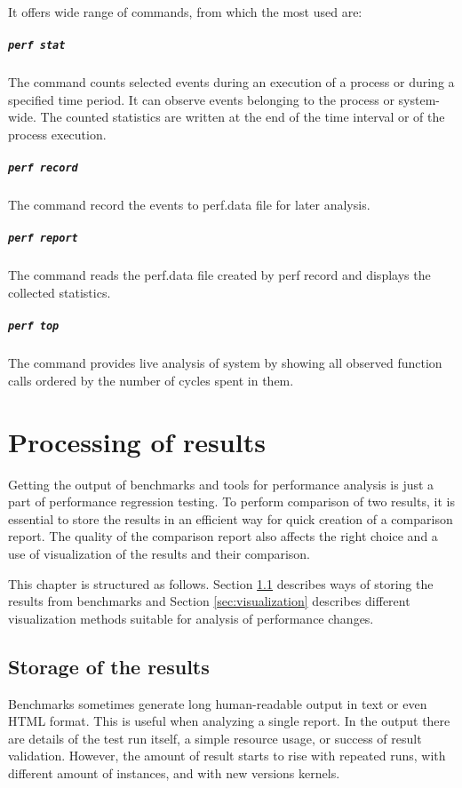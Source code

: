 It offers wide range of commands, from which the most used are:
\paragraph{\texttt{perf stat}} The command counts selected events during an
execution of a process or during a specified time period. It can observe events belonging
to the process or system-wide. The counted statistics are written at the end of the
time interval or of the process execution.
\paragraph{\texttt{perf record}} The command record the events to perf.data file for later
analysis.
\paragraph{\texttt{perf report}} The command reads the perf.data file created by perf record
and displays the collected statistics.
\paragraph{\texttt{perf top}} The command provides live analysis of system by showing all
observed function calls ordered by the number of cycles spent in them.



\chapter{Processing of results} \label{ch:processing}
Getting the output of benchmarks and tools for performance analysis is just a
part of performance regression testing. To perform comparison of two results, it is
essential to store the results in an efficient way for quick creation of a
comparison report. The quality of the comparison report also affects the right
choice and a use of visualization of the results and their comparison.

This chapter is structured as follows. Section \ref{sec:storage} describes
ways of storing the results from benchmarks and Section \ref{sec:visualization}
describes different visualization methods suitable for analysis of performance
changes.

\section{Storage of the results} \label{sec:storage}
Benchmarks sometimes generate long human-readable output in text or even HTML
format. This is useful when analyzing a single report. In the output there are details
of the test run itself, a simple resource usage, or success of result validation.
However, the amount of result starts to rise with repeated runs, with different
amount of instances, and with new versions kernels.

